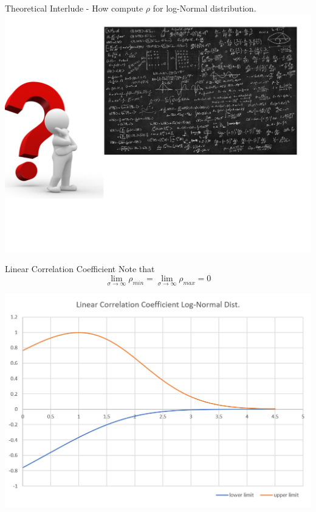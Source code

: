 \documentclass[11pt]{beamer}
\theoremstyle{plain}
\theoremstyle{definition}
\theoremstyle{remark}
\begin{document}
\begin{frame}{Theoretical Interlude - How compute $\rho$ for log-Normal distribution.}
\includegraphics[scale=.3]{fig/exercise_2.png} 
\end{frame}
%
\begin{frame}{Linear Correlation Coefficient}
Note that
$$
\lim\limits_{\sigma \rightarrow \infty} \rho_{min} =\lim\limits_{\sigma \rightarrow \infty} \rho_{max}=0  
$$
\begin{center}
\includegraphics[scale=0.5]{fig/linear_correlation_lognormal.png} 
\end{center}
\end{frame}
%
\end{document}
